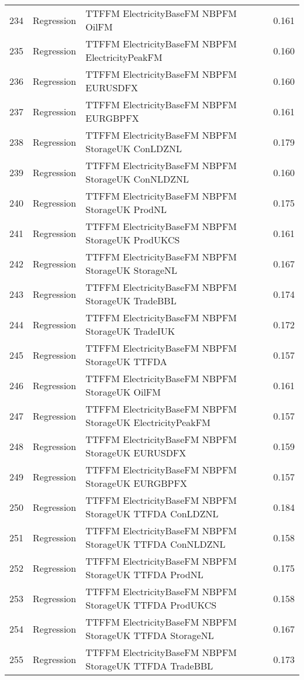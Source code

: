 \begin{table}[ht]
\begin{tabular}{rllr}
  234 & Regression & TTFFM ElectricityBaseFM NBPFM OilFM & 0.161 \\ 
  235 & Regression & TTFFM ElectricityBaseFM NBPFM ElectricityPeakFM & 0.160 \\ 
  236 & Regression & TTFFM ElectricityBaseFM NBPFM EURUSDFX & 0.160 \\ 
  237 & Regression & TTFFM ElectricityBaseFM NBPFM EURGBPFX & 0.161 \\ 
  238 & Regression & TTFFM ElectricityBaseFM NBPFM StorageUK ConLDZNL & 0.179 \\ 
  239 & Regression & TTFFM ElectricityBaseFM NBPFM StorageUK ConNLDZNL & 0.160 \\ 
  240 & Regression & TTFFM ElectricityBaseFM NBPFM StorageUK ProdNL & 0.175 \\ 
  241 & Regression & TTFFM ElectricityBaseFM NBPFM StorageUK ProdUKCS & 0.161 \\ 
  242 & Regression & TTFFM ElectricityBaseFM NBPFM StorageUK StorageNL & 0.167 \\ 
  243 & Regression & TTFFM ElectricityBaseFM NBPFM StorageUK TradeBBL & 0.174 \\ 
  244 & Regression & TTFFM ElectricityBaseFM NBPFM StorageUK TradeIUK & 0.172 \\ 
  245 & Regression & TTFFM ElectricityBaseFM NBPFM StorageUK TTFDA & 0.157 \\ 
  246 & Regression & TTFFM ElectricityBaseFM NBPFM StorageUK OilFM & 0.161 \\ 
  247 & Regression & TTFFM ElectricityBaseFM NBPFM StorageUK ElectricityPeakFM & 0.157 \\ 
  248 & Regression & TTFFM ElectricityBaseFM NBPFM StorageUK EURUSDFX & 0.159 \\ 
  249 & Regression & TTFFM ElectricityBaseFM NBPFM StorageUK EURGBPFX & 0.157 \\ 
  250 & Regression & TTFFM ElectricityBaseFM NBPFM StorageUK TTFDA ConLDZNL & 0.184 \\ 
  251 & Regression & TTFFM ElectricityBaseFM NBPFM StorageUK TTFDA ConNLDZNL & 0.158 \\ 
  252 & Regression & TTFFM ElectricityBaseFM NBPFM StorageUK TTFDA ProdNL & 0.175 \\ 
  253 & Regression & TTFFM ElectricityBaseFM NBPFM StorageUK TTFDA ProdUKCS & 0.158 \\ 
  254 & Regression & TTFFM ElectricityBaseFM NBPFM StorageUK TTFDA StorageNL & 0.167 \\ 
  255 & Regression & TTFFM ElectricityBaseFM NBPFM StorageUK TTFDA TradeBBL & 0.173 \\ 

\end{tabular}
\end{table}
